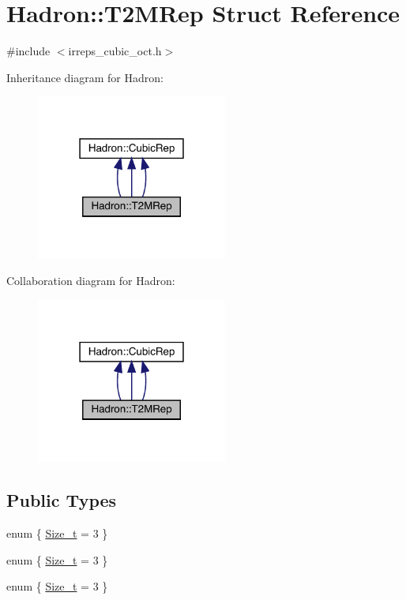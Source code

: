 \hypertarget{structHadron_1_1T2MRep}{}\section{Hadron\+:\+:T2\+M\+Rep Struct Reference}
\label{structHadron_1_1T2MRep}


{\ttfamily \#include $<$irreps\+\_\+cubic\+\_\+oct.\+h$>$}



Inheritance diagram for Hadron\+:
\nopagebreak
\begin{figure}[H]
\begin{center}
\leavevmode
\includegraphics[width=178pt]{d8/d81/structHadron_1_1T2MRep__inherit__graph}
\end{center}
\end{figure}


Collaboration diagram for Hadron\+:
\nopagebreak
\begin{figure}[H]
\begin{center}
\leavevmode
\includegraphics[width=178pt]{db/d62/structHadron_1_1T2MRep__coll__graph}
\end{center}
\end{figure}
\subsection*{Public Types}
\begin{DoxyCompactItemize}
\item 
enum \{ \mbox{\hyperlink{structHadron_1_1T2MRep_ae6706abc602db083a547da3b4f889772a8c066d0d652b6dd6f011f24db92e8d34}{Size\+\_\+t}} = 3
 \}
\item 
enum \{ \mbox{\hyperlink{structHadron_1_1T2MRep_ae6706abc602db083a547da3b4f889772a8c066d0d652b6dd6f011f24db92e8d34}{Size\+\_\+t}} = 3
 \}
\item 
enum \{ \mbox{\hyperlink{structHadron_1_1T2MRep_ae6706abc602db083a547da3b4f889772a8c066d0d652b6dd6f011f24db92e8d34}{Size\+\_\+t}} = 3
 \}
\end{DoxyCompactItemize}
